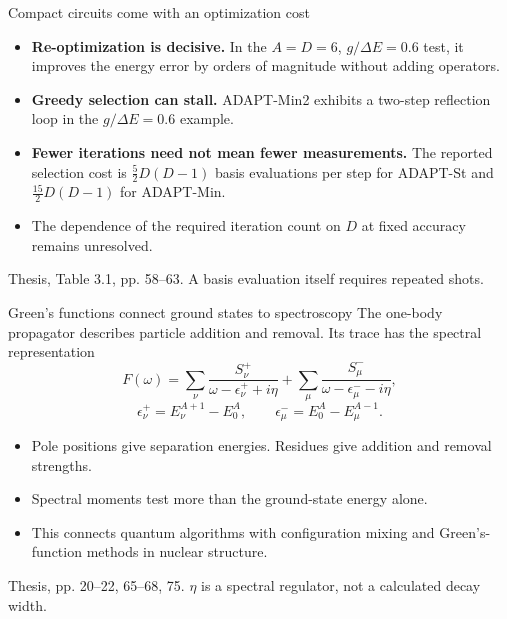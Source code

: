 \documentclass[11pt,aspectratio=169]{beamer}
\newcommand{\src}[1]{\par\vfill{\fontsize{7}{8}\selectfont\color{gray}#1\par}}
\begin{document}
\begin{frame}{Compact circuits come with an optimization cost}
\begin{itemize}\setlength\itemsep{.7em}
\item \textbf{Re-optimization is decisive.} In the $A=D=6$, $g/\Delta E=0.6$ test, it improves the energy error by orders of magnitude without adding operators.
\item \textbf{Greedy selection can stall.} ADAPT-Min2 exhibits a two-step reflection loop in the $g/\Delta E=0.6$ example.
\item \textbf{Fewer iterations need not mean fewer measurements.} The reported selection cost is $\tfrac52D(D-1)$ basis evaluations per step for ADAPT-St and $\tfrac{15}{2}D(D-1)$ for ADAPT-Min.
\item The dependence of the required iteration count on $D$ at fixed accuracy remains unresolved.
\end{itemize}
\src{Thesis, Table 3.1, pp. 58--63. A basis evaluation itself requires repeated shots.}
\end{frame}

\begin{frame}{Green's functions connect ground states to spectroscopy}
The one-body propagator describes particle addition and removal. Its trace has the spectral representation
\[
F(\omega)=\sum_\nu\frac{S_\nu^+}{\omega-\epsilon_\nu^++i\eta}
+\sum_\mu\frac{S_\mu^-}{\omega-\epsilon_\mu^--i\eta},
\]
\[
\epsilon_\nu^+=E_\nu^{A+1}-E_0^A,
\qquad \epsilon_\mu^-=E_0^A-E_\mu^{A-1}.
\]
\begin{itemize}\setlength\itemsep{.55em}
\item Pole positions give separation energies. Residues give addition and removal strengths.
\item Spectral moments test more than the ground-state energy alone.
\item This connects quantum algorithms with configuration mixing and Green's-function methods in nuclear structure.
\end{itemize}
\src{Thesis, pp. 20--22, 65--68, 75. $\eta$ is a spectral regulator, not a calculated decay width.}
\end{frame}
\end{document}
